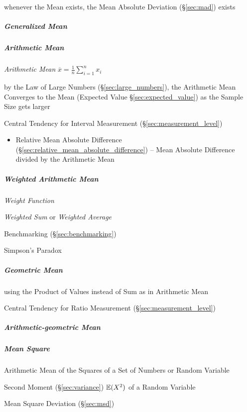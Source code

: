 whenever the Mean exists, the Mean Absolute Deviation (\S\ref{sec:mad}) exists



\subparagraph{Generalized Mean}\label{sec:generalized_mean}\hfill


\subparagraph{Arithmetic Mean}\label{sec:arithmetic_mean}\hfill

\emph{Arithmetic Mean} $\overline{x} = \frac{1}{n}\sum_{i=1}^n x_i$

by the Law of Large Numbers (\S\ref{sec:large_numbers}), the Arithmetic Mean
Converges to the Mean (Expected Value \S\ref{sec:expected_value}) as the Sample
Size gets larger

Central Tendency for Interval Measurement (\S\ref{sec:measurement_level})

\begin{itemize}
  \item Relative Mean Absolute Difference
    (\S\ref{sec:relative_mean_absolute_difference}) -- Mean Absolute Difference
    divided by the Arithmetic Mean
\end{itemize}



\subparagraph{Weighted Arithmetic Mean}\label{sec:weighted_mean}\hfill

\emph{Weight Function}

\emph{Weighted Sum} or \emph{Weighted Average}

\fist Benchmarking (\S\ref{sec:benchmarking})

Simpson's Paradox



\subparagraph{Geometric Mean}\label{sec:geometric_mean}\hfill

using the Product of Values instead of Sum as in Arithmetic Mean

Central Tendency for Ratio Measurement (\S\ref{sec:measurement_level})



\subparagraph{Arithmetic-geometric Mean}\label{sec:arithmetic_geometric}\hfill

\subparagraph{Mean Square}\label{sec:mean_square}\hfill

Arithmetic Mean of the Squares of a Set of Numbers or Random Variable

Second Moment (\S\ref{sec:variance}) $\mathbb{E}(X^2)$ of a Random Variable

\fist Mean Square Deviation (\S\ref{sec:msd})



